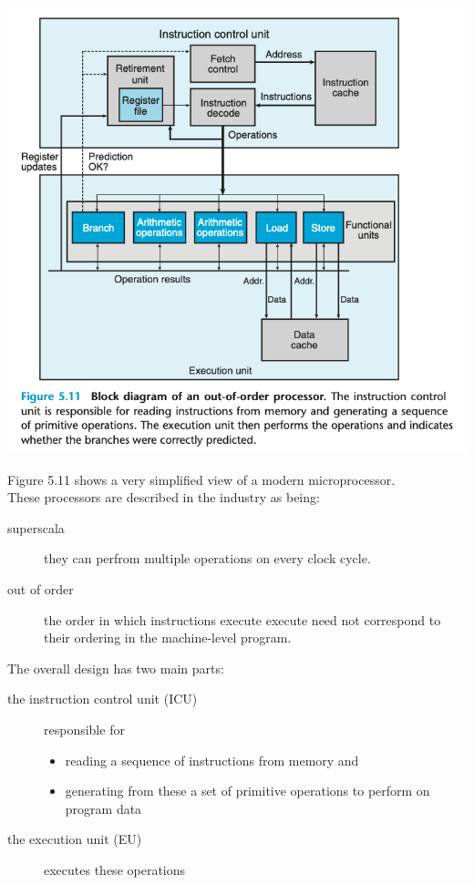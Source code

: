 \documentclass[11pt]{article}
\begin{document}
\begin{center}
\includegraphics[width=.9\linewidth]{pics/figure5.11-block-diagram-of-an-out-of-order-processor.png}
\end{center}

Figure 5.11 shows a very simplified view of a modern microprocessor.\\

These processors are described in the industry as being:\\
\begin{description}
\item[{superscala}] they can perfrom multiple operations on every clock cycle.\\
\item[{out of order}] the order in which instructions execute execute need not correspond to their ordering in the machine-level program.\\
\end{description}

The overall design has two main parts:\\
\begin{description}
\item[{the instruction control unit (ICU)}] responsible for\\
\begin{itemize}
\item reading a sequence of instructions from memory and\\
\item generating from these a set of primitive operations to perform on program data\\
\end{itemize}
\item[{the execution unit (EU)}] executes these operations\\
\end{description}
\end{document}
